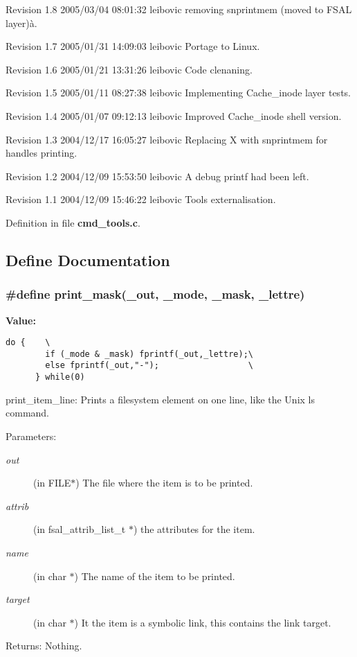 Revision 1.8 2005/03/04 08:01:32 leibovic removing snprintmem (moved to FSAL layer)\`{a}.

Revision 1.7 2005/01/31 14:09:03 leibovic Portage to Linux.

Revision 1.6 2005/01/21 13:31:26 leibovic Code clenaning.

Revision 1.5 2005/01/11 08:27:38 leibovic Implementing Cache\_\-inode layer tests.

Revision 1.4 2005/01/07 09:12:13 leibovic Improved Cache\_\-inode shell version.

Revision 1.3 2004/12/17 16:05:27 leibovic Replacing X with snprintmem for handles printing.

Revision 1.2 2004/12/09 15:53:50 leibovic A debug printf had been left.

Revision 1.1 2004/12/09 15:46:22 leibovic Tools externalisation.

Definition in file {\bf cmd\_\-tools.c}.

\subsection{Define Documentation}
\subsubsection{\setlength{\rightskip}{0pt plus 5cm}\#define print\_\-mask(\_\-out, \_\-mode, \_\-mask, \_\-lettre)}\label{cmd__tools_8c_a1}


{\bf Value:}

\footnotesize\begin{verbatim}do {    \
        if (_mode & _mask) fprintf(_out,_lettre);\
        else fprintf(_out,"-");                  \
      } while(0)
\end{verbatim}\normalsize 
print\_\-item\_\-line: Prints a filesystem element on one line, like the Unix ls command.

\begin{Desc}
\item[Parameters:]
\begin{description}
\item[{\em out}](in FILE$\ast$) The file where the item is to be printed. \item[{\em attrib}](in fsal\_\-attrib\_\-list\_\-t $\ast$) the attributes for the item. \item[{\em name}](in char $\ast$) The name of the item to be printed. \item[{\em target}](in char $\ast$) It the item is a symbolic link, this contains the link target. \end{description}
\end{Desc}
\begin{Desc}
\item[Returns:]Nothing. \end{Desc}


